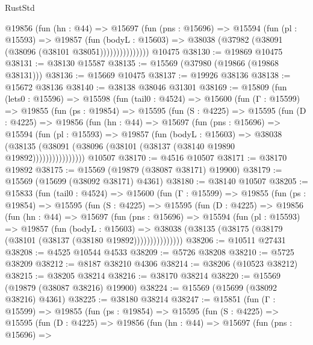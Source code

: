 \begin{lexlean}{RustStd}
\begin{coremodule}
                @19856
                  (fun (hn : @44) =>
                  @15697
                    (fun (pns : @15696) =>
                    @15594
                      (fun (pl : @15593) =>
                      @19857
                        (fun (bodyL : @15603) =>
                        @38038 (@37982 (@38091 (@38096 (@38101 @38051)))))))))))))))
    @10475
@38130 := @19869 @10475
@38131 := @38130 @15587
@38135 := @15569 (@37980 (@19866 (@19868 @38131)))
@38136 := @15669 @10475
@38137 := @19926 @38136
@38138 := @15672 @38136
@38140 := @38138 @38046 @31301
@38169 := @15809
    (fun (lets0 : @15596) =>
    @15598
      (fun (tail0 : @4524) =>
      @15600
        (fun (Γ : @15599) =>
        @19855
          (fun (ps : @19854) =>
          @15595
            (fun (S : @4225) =>
            @15595
              (fun (D : @4225) =>
              @19856
                (fun (hn : @44) =>
                @15697
                  (fun (pns : @15696) =>
                  @15594
                    (fun (pl : @15593) =>
                    @19857
                      (fun (bodyL : @15603) =>
                      @38038
                        (@38135
                          (@38091 (@38096 (@38101 (@38137 (@38140 @19890 @19892))))))))))))))))
    @10507
@38170 := @4516 @10507
@38171 := @38170 @19892
@38175 := @15569 (@19879 (@38087 @38171) @19900)
@38179 := @15569 (@15699 (@38092 @38171) @4361)
@38180 := @38140 @10507
@38205 := @15833
    (fun (tail0 : @4524) =>
    @15600
      (fun (Γ : @15599) =>
      @19855
        (fun (ps : @19854) =>
        @15595
          (fun (S : @4225) =>
          @15595
            (fun (D : @4225) =>
            @19856
              (fun (hn : @44) =>
              @15697
                (fun (pns : @15696) =>
                @15594
                  (fun (pl : @15593) =>
                  @19857
                    (fun (bodyL : @15603) =>
                    @38038 (@38135 (@38175 (@38179 (@38101 (@38137 (@38180 @19892)))))))))))))))
@38206 := @10511 @27431
@38208 := @4525 @10544 @4533
@38209 := @5726 @38208
@38210 := @5725 @38209
@38212 := @8187 @38210 @4306
@38214 := @38206 (@10523 @38212)
@38215 := @38205 @38214
@38216 := @38170 @38214
@38220 := @15569 (@19879 (@38087 @38216) @19900)
@38224 := @15569 (@15699 (@38092 @38216) @4361)
@38225 := @38180 @38214
@38247 := @15851
    (fun (Γ : @15599) =>
    @19855
      (fun (ps : @19854) =>
      @15595
        (fun (S : @4225) =>
        @15595
          (fun (D : @4225) =>
          @19856
            (fun (hn : @44) =>
            @15697
              (fun (pns : @15696) =>

\end{coremodule}
\end{lexlean}
